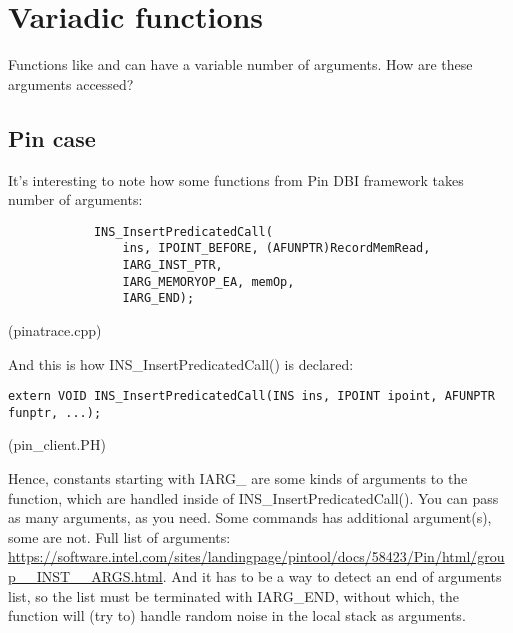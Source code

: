 \section{Variadic functions}

Functions like \printf and \scanf can have a variable number of arguments.
How are these arguments accessed?




\subsection{Pin case}

It's interesting to note how some functions from Pin \ac{DBI} framework takes number of arguments:

\begin{lstlisting}
            INS_InsertPredicatedCall(
                ins, IPOINT_BEFORE, (AFUNPTR)RecordMemRead,
                IARG_INST_PTR,
                IARG_MEMORYOP_EA, memOp,
                IARG_END);
\end{lstlisting}
(pinatrace.cpp)

And this is how INS\_InsertPredicatedCall() is declared:

\begin{lstlisting}
extern VOID INS_InsertPredicatedCall(INS ins, IPOINT ipoint, AFUNPTR funptr, ...);
\end{lstlisting}
(pin\_client.PH)

Hence, constants starting with IARG\_ are some kinds of arguments to the function,
which are handled inside of INS\_InsertPredicatedCall().
You can pass as many arguments, as you need.
Some commands has additional argument(s), some are not.
Full list of arguments:
\url{https://software.intel.com/sites/landingpage/pintool/docs/58423/Pin/html/group__INST__ARGS.html}.
And it has to be a way to detect an end of arguments list, so the list must be terminated with IARG\_END, without which,
the function will (try to) handle random noise in the local stack as arguments.



